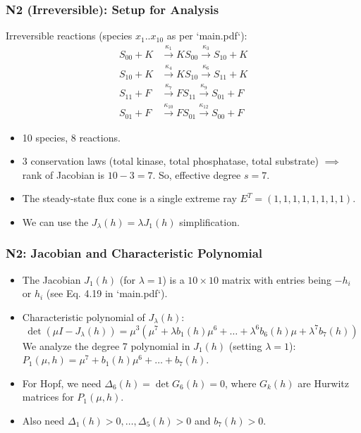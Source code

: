 \documentclass[aspectratio=169]{beamer}
\begin{document}
\begin{frame}{\insertsectionhead}
	\frametitle{N2 (Irreversible): Setup for Analysis}
	Irreversible reactions (species $x_1..x_{10}$ as per `main.pdf`):
	\begin{align*}
		S_{00} + K &\xrightarrow{\kappa_1} KS_{00} \xrightarrow{\kappa_3} S_{10} + K \\
		S_{10} + K &\xrightarrow{\kappa_4} KS_{10} \xrightarrow{\kappa_6} S_{11} + K \\
		S_{11} + F &\xrightarrow{\kappa_7} FS_{11} \xrightarrow{\kappa_9} S_{01} + F \\
		S_{01} + F &\xrightarrow{\kappa_{10}} FS_{01} \xrightarrow{\kappa_{12}} S_{00} + F
	\end{align*}
	\begin{itemize}
		\item 10 species, 8 reactions.
		\item 3 conservation laws (total kinase, total phosphatase, total substrate) $\implies$ rank of Jacobian is $10-3=7$. So, effective degree $s=7$.
		\item The steady-state flux cone is a \alert{single extreme ray} $E^T = (1,1,1,1,1,1,1,1)$.
		\item We can use the $J_\lambda(h) = \lambda J_1(h)$ simplification.
	\end{itemize}
\end{frame}

\begin{frame}{\insertsectionhead}
	\frametitle{N2: Jacobian and Characteristic Polynomial}
	\begin{itemize}
		\item The Jacobian $J_1(h)$ (for $\lambda=1$) is a $10 \times 10$ matrix with entries being $-h_i$ or $h_i$ (see Eq. 4.19 in `main.pdf`).
		\item Characteristic polynomial of $J_\lambda(h)$:
			$$ \det(\mu I - J_\lambda(h)) = \mu^3 (\mu^7 + \lambda b_1(h)\mu^6 + \dots + \lambda^6 b_6(h)\mu + \lambda^7 b_7(h)) $$
			We analyze the degree 7 polynomial in $J_1(h)$ (setting $\lambda=1$):
			$P_1(\mu,h) = \mu^7 + b_1(h)\mu^6 + \dots + b_7(h)$.
		\item For Hopf, we need $\Delta_6(h) = \det G_6(h) = 0$, where $G_k(h)$ are Hurwitz matrices for $P_1(\mu,h)$.
		\item Also need $\Delta_1(h)>0, \dots, \Delta_5(h)>0$ and $b_7(h)>0$.
	\end{itemize}
\end{frame}
\end{document}
